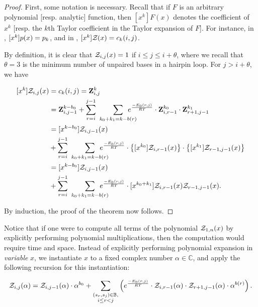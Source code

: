 \begin{proof}
First, some notation is necessary.
Recall that if $F$ is an arbitrary
polynomial [resp. analytic] function, then $[x^k] F(x)$
denotes the coefficient of $x^k$ [resp. the $k$th Taylor coefficient in the
Taylor expansion of $F$]. For instance, in ,
$[x^k]p(x) = p_k$, and in ,
$[x^k]{\mathcal Z}_{}(x) = c_k(i,j)$.

By definition, it is clear that ${\mathcal Z}_{i,j}(x)=1$ if $i \leq j \leq i + \theta$,
where we recall that $\theta = 3$ is the minimum number of unpaired bases in
a hairpin loop. For $j > i + \theta$, we have

\begin{align}
\begin{split}
[x^k] \emZ{i,j} &= c_k(i,j) = \bfZ{k}{i,j} \\
&= \bfZ{k-b_0}{i,j-1} +
\sum_{r=i}^{j-1}\hspace{2.25em} \sum_{\mathclap{k_0+k_1=k-b(r)}}\enspace
\boltzNuss{r,j} \cdot \bfZ{k_0}{i,r-1} \cdot \bfZ{k_1}{r+1,j-1} \\
&= [x^{k-b_0}] \emZ{i,j-1} \\
&+ \sum_{r=i}^{j-1}\hspace{2.25em} \sum_{\mathclap{k_0+k_1=k-b(r)}}\enspace
\boltzNuss{r,j} \cdot \left\{ [x^{k_0}] \emZ{i,r-1} \right\} \cdot
\left\{ [x^{k_1}] \emZ{r-1,j-1} \right\} \\
&= [x^{k-b_0}] \emZ{i,j-1} \\
&+ \sum_{r=i}^{j-1}\hspace{2.25em} \sum_{\mathclap{k_0+k_1=k-b(r)}}\enspace
\boltzNuss{r,j} \cdot [x^{k_0+k_1}] \emZ{i,r-1} \emZ{r-1,j-1} .\\
\end{split}
\end{align}

By induction, the proof of the theorem now follows.
\end{proof}

Notice that if one were to compute all terms of the polynomial ${\mathcal Z}_{1,n}(x)$
by explicitly performing polynomial multiplications,
then the computation would require  time and  space.
Instead of explicitly performing polynomial expansion in {\em variable} $x$,
we instantiate $x$ to a fixed complex number $\alpha \in \mathbb{C}$, and apply
the following recursion for this instantiation:

\begin{align}
\label{eq:fftbor:fftborNussPolyAlpha}
\emZof{i,j}{\alpha} = \emZof{i,j-1}{\alpha} \cdot \alpha^{b_0} +
\sum_{\substack{(s_r,s_j) \in \bpSet, \\ i \le r<j}}
\left(
\boltzNuss{r,j} \cdot
\emZof{i,r-1}{\alpha} \cdot \emZof{r+1,j-1}{\alpha} \cdot \alpha^{b(r)}
\right).
\end{align}

